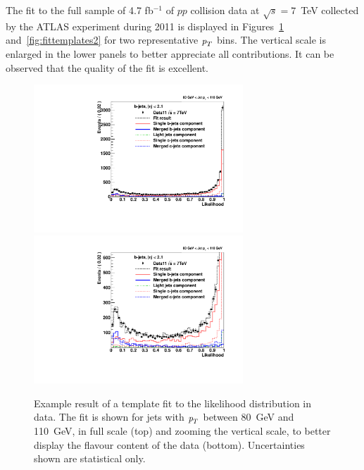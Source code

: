 The fit to the full sample of 4.7 fb$^{-1}$ of $pp$ collision data at $\sqrt{s}=7$~TeV collected by the ATLAS experiment during 2011 is displayed in Figures~\ref{fig:fittemplates1} and~\ref{fig:fittemplates2} for two representative ${\emph{p}_{T}}$ bins. The vertical scale is enlarged in the lower panels to better appreciate all contributions. It can be observed that the quality of the fit is excellent.
\begin{figure}[tp]
\centering
\includegraphics[width=0.7\textwidth]{FIGS/Fits/LikelihoodFit_3param_ETAFull_Bin2.pdf}
\includegraphics[width=0.7\textwidth]{FIGS/Fits/LikelihoodFit_3param_ETAFull_ZOOM_Bin2.pdf}
\caption{Example result of a template fit to the likelihood distribution in data. The fit is shown for jets with ${\emph{p}_{T}}$ between  80~GeV and 110~GeV, in full scale (top) and zooming the vertical scale, to better display the flavour content of the data (bottom). Uncertainties shown are statistical only.}
\label{fig:fittemplates1}
\end{figure}
